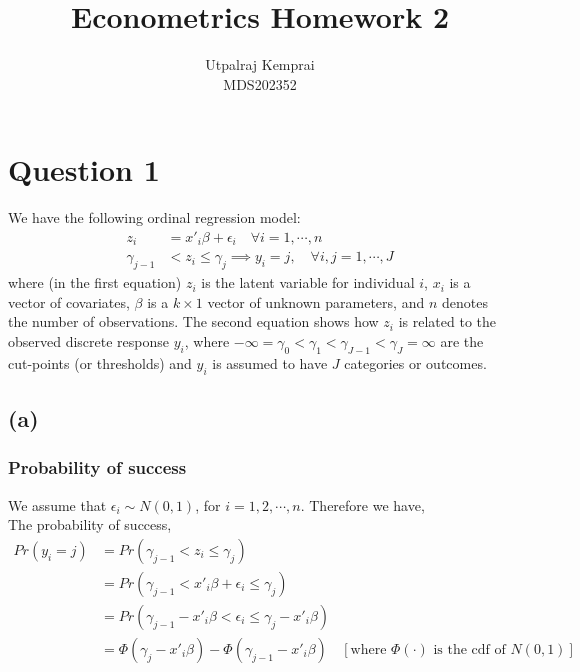 \documentclass[a4paper]{article}
\begin{document}
\title{Econometrics Homework 2}
\author{Utpalraj Kemprai \\
MDS202352}
\date{}

\maketitle

\newpage

\section*{Question 1}

We have the following ordinal regression model:
\begin{align*}
    z_{i} &= x'_{i}\beta + \epsilon_{i} \quad \forall i = 1,\cdots,n \\
    \gamma_{j-1} &< z_{i} \leq \gamma_{j} \implies y_{i} = j, \quad \forall i, j = 1, \cdots, J
\end{align*}
where (in the first equation) $z_i$ is the latent variable for individual $i$, $x_i$ is a  vector of covariates,
$\beta$ is a $k\times1$ vector of unknown parameters, and $n$ denotes the number of observations. The second equation shows how $z_i$ is related to the observed discrete response $y_i$, where $-\infty = \gamma_0 < \gamma_1 <
\gamma_{J-1} < \gamma_J = \infty$ are the cut-points (or thresholds) and $y_i$ is assumed to have $J$ categories or outcomes.

\subsection*{(a)}

\subsubsection*{Probability of success}

We assume that $\epsilon_i \sim N(0,1)$, for $i = 1,2,\cdots, n$. Therefore we have,\\
The probability of success,
\begin{align*}
    Pr(y_i = j) &= Pr(\gamma_{j-1} < z_{i} \leq \gamma_j)\\
                &= Pr(\gamma_{j-1} < x'_{i}\beta + \epsilon_{i} \leq \gamma_j) \\
                &= Pr(\gamma_{j-1} - x'_{i}\beta < \epsilon_{i} \leq \gamma_j - x'_{i}\beta)\\
                &= \Phi(\gamma_j - x'_{i}\beta) - \Phi(\gamma_{j-1} - x'_{i}\beta) &[\text{where } \Phi(\cdot) \text{ is the cdf of }N(0,1) ]
\end{align*}
\end{document}
